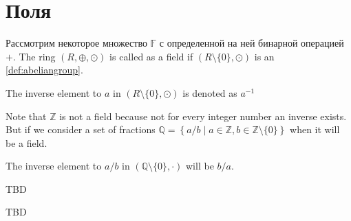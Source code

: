 \section{Поля}
\begin{definition}[Поле]
  Рассмотрим некоторое множество $\mathbb{F}$ с определенной на ней
  бинарной операцией $+$.
  The ring $\left(R, \oplus, \odot\right)$ is called as a field if
  $\left(R \setminus \{0\}, \odot\right)$ is an \autoref{def:abeliangroup}.

  The inverse element to $a$ in
  $\left(R \setminus\{0\}, \odot\right)$ is denoted as $a^{-1}$
  \label{def:field}
\end{definition}

\begin{example}
  Note that $\mathbb{Z}$ is not a field because not for every integer
  number an inverse exists. But if we consider a set of fractions
  $\mathbb{Q} = \left\{a/b \mid a \in \mathbb{Z}, b \in
  \mathbb{Z}\setminus\{0\}\right\}$ when it will be a field.

  The
  inverse element to $a/b$  in
  $\left(\mathbb{Q}\setminus\{0\}, \cdot\right)$  will be $b/a$.
  \label{ex:field_q}
\end{example}

\begin{example}
TBD
  \label{ex:field_r}
\end{example}

\begin{example}
TBD
  \label{ex:field_c}
\end{example}
